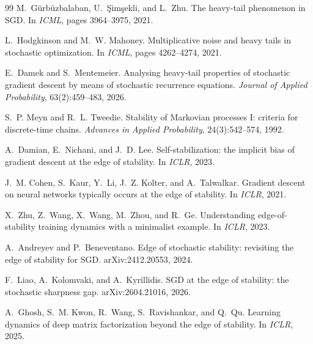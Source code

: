 \documentclass[10pt]{article}
\theoremstyle{definition}
\theoremstyle{remark}
\begin{document}
\begin{thebibliography}{99}
M.~G\"urb\"uzbalaban, U.~\c{S}im\c{s}ekli, and L.~Zhu. The heavy-tail
phenomenon in SGD. In \emph{ICML}, pages 3964--3975, 2021.

L.~Hodgkinson and M.~W. Mahoney. Multiplicative noise and heavy tails in
stochastic optimization. In \emph{ICML}, pages 4262--4274, 2021.

E.~Damek and S.~Mentemeier. Analysing heavy-tail properties of stochastic
gradient descent by means of stochastic recurrence equations.
\emph{Journal of Applied Probability}, 63(2):459--483, 2026.

S.~P. Meyn and R.~L. Tweedie. Stability of Markovian processes I: criteria
for discrete-time chains. \emph{Advances in Applied Probability},
24(3):542--574, 1992.

A.~Damian, E.~Nichani, and J.~D. Lee. Self-stabilization: the implicit bias of
gradient descent at the edge of stability. In \emph{ICLR}, 2023.

J.~M. Cohen, S.~Kaur, Y.~Li, J.~Z. Kolter, and A.~Talwalkar. Gradient descent
on neural networks typically occurs at the edge of stability. In
\emph{ICLR}, 2021.

X.~Zhu, Z.~Wang, X.~Wang, M.~Zhou, and R.~Ge. Understanding
edge-of-stability training dynamics with a minimalist example. In
\emph{ICLR}, 2023.

A.~Andreyev and P.~Beneventano. Edge of stochastic stability: revisiting the
edge of stability for SGD. arXiv:2412.20553, 2024.

F.~Liao, A.~Kolomvaki, and A.~Kyrillidis. SGD at the edge of stability: the
stochastic sharpness gap. arXiv:2604.21016, 2026.

A.~Ghosh, S.~M. Kwon, R.~Wang, S.~Ravishankar, and Q.~Qu. Learning dynamics
of deep matrix factorization beyond the edge of stability. In \emph{ICLR},
2025.
\end{thebibliography}
\end{document}
